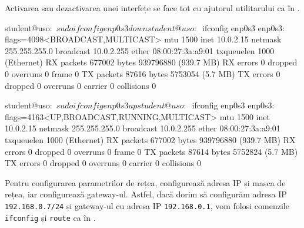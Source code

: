 Activarea sau dezactivarea unei interfețe se face tot cu ajutorul utilitarului  ca în .

\begin{screen}[caption={Activarea și dezactivarea unei interfețe folosind ifconfig},label={lst:net:enable-ifconfig}]
student@uso:~$ sudo ifconfig enp0s3 down

student@uso:~$ ifconfig enp0s3
enp0s3: flags=4098<BROADCAST,MULTICAST>  mtu 1500
        inet 10.0.2.15  netmask 255.255.255.0  broadcast 10.0.2.255
        ether 08:00:27:3a:a9:01  txqueuelen 1000  (Ethernet)
        RX packets 677002  bytes 939796880 (939.7 MB)
        RX errors 0  dropped 0  overruns 0  frame 0
        TX packets 87616  bytes 5753054 (5.7 MB)
        TX errors 0  dropped 0 overruns 0  carrier 0  collisions 0

student@uso:~$ sudo ifconfig enp0s3 up

student@uso:~$ ifconfig enp0s3
enp0s3: flags=4163<UP,BROADCAST,RUNNING,MULTICAST>  mtu 1500
        inet 10.0.2.15  netmask 255.255.255.0  broadcast 10.0.2.255
        ether 08:00:27:3a:a9:01  txqueuelen 1000  (Ethernet)
        RX packets 677002  bytes 939796880 (939.7 MB)
        RX errors 0  dropped 0  overruns 0  frame 0
        TX packets 87614  bytes 5752824 (5.7 MB)
        TX errors 0  dropped 0 overruns 0  carrier 0  collisions 0
\end{screen}

Pentru configurarea parametrilor de rețea,  configurează adresa IP și masca de rețea, iar  configurează gateway-ul.
Astfel, dacă dorim să configurăm adresa IP \texttt{192.168.0.7/24} și gateway-ul cu adresa IP \texttt{192.168.0.1}, vom folosi comenzile \texttt{ifconfig} și \texttt{route} ca în .

